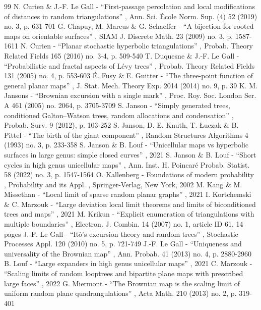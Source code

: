 \documentclass[11pt]{article}
\theoremstyle{plain}
\theoremstyle{definition}
\theoremstyle{remark}
\begin{document}
\begin{thebibliography}{99}
 N. Curien \& J.-F. Le Gall - “First-passage percolation and local modifications of distances in random triangulations” , Ann. Sci. École Norm. Sup. (4) 52 (2019) no. 3, p. 631-701
 G. Chapuy, M. Marcus \& G. Schaeffer - “A bijection for rooted maps on orientable surfaces” , SIAM J. Discrete Math. 23 (2009) no. 3, p. 1587-1611
 N. Curien - “Planar stochastic hyperbolic triangulations” , Probab. Theory Related Fields 165 (2016) no. 3-4, p. 509-540
 T. Duquesne \& J.-F. Le Gall - “Probabilistic and fractal aspects of Lévy trees” , Probab. Theory Related Fields 131 (2005) no. 4, p. 553-603
 É. Fusy \& E. Guitter - “The three-point function of general planar maps” , J. Stat. Mech. Theory Exp. 2014 (2014) no. 9, p. 39
 K. M. Jansons - “Brownian excursion with a single mark” , Proc. Roy. Soc. London Ser. A 461 (2005) no. 2064, p. 3705-3709
 S. Janson - “Simply generated trees, conditioned Galton–Watson trees, random allocations and condensation” , Probab. Surv. 9 (2012), p. 103-252
 S. Janson, D. E. Knuth, T. Łuczak \& B. Pittel - “The birth of the giant component” , Random Structures Algorithms 4 (1993) no. 3, p. 233-358
 S. Janson \& B. Louf - “Unicellular maps vs hyperbolic surfaces in large genus: simple closed curves” , 2021
 S. Janson \& B. Louf - “Short cycles in high genus unicellular maps” , Ann. Inst. H. Poincaré Probab. Statist. 58 (2022) no. 3, p. 1547-1564
 O. Kallenberg - Foundations of modern probability , Probability and its Appl. , Springer-Verlag, New York, 2002
 M. Kang \& M. Missethan - “Local limit of sparse random planar graphs” , 2021
 I. Kortchemski \& C. Marzouk - “Large deviation local limit theorems and limits of biconditioned trees and maps” , 2021
 M. Krikun - “Explicit enumeration of triangulations with multiple boundaries” , Electron. J. Combin. 14 (2007) no. 1, article ID 61, 14 pages
 J.-F. Le Gall - “Itô’s excursion theory and random trees” , Stochastic Processes Appl. 120 (2010) no. 5, p. 721-749
 J.-F. Le Gall - “Uniqueness and universality of the Brownian map” , Ann. Probab. 41 (2013) no. 4, p. 2880-2960
 B. Louf - “Large expanders in high genus unicellular maps” , 2021
 C. Marzouk - “Scaling limits of random looptrees and bipartite plane maps with prescribed large faces” , 2022
 G. Miermont - “The Brownian map is the scaling limit of uniform random plane quadrangulations” , Acta Math. 210 (2013) no. 2, p. 319-401

\end{thebibliography}
\end{document}
